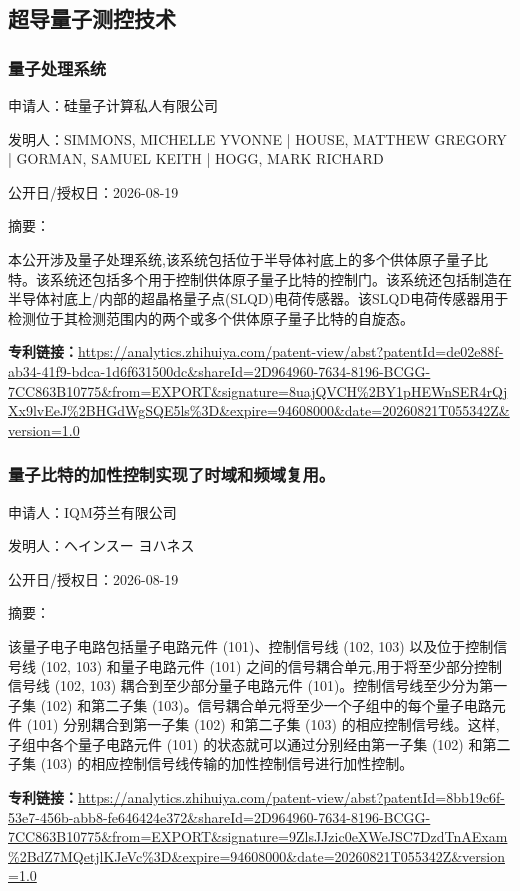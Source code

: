 \documentclass[12pt,a4paper]{ctexart}
\begin{document}
\subsection{ 超导量子测控技术 }

\subsubsection{ 量子处理系统 }

申请人：硅量子计算私人有限公司

发明人：SIMMONS, MICHELLE YVONNE | HOUSE, MATTHEW GREGORY | GORMAN, SAMUEL KEITH | HOGG, MARK RICHARD

公开日/授权日：2026-08-19

摘要：

本公开涉及量子处理系统,该系统包括位于半导体衬底上的多个供体原子量子比特。该系统还包括多个用于控制供体原子量子比特的控制门。该系统还包括制造在半导体衬底上/内部的超晶格量子点(SLQD)电荷传感器。该SLQD电荷传感器用于检测位于其检测范围内的两个或多个供体原子量子比特的自旋态。

\noindent\textbf{专利链接：}\url{https://analytics.zhihuiya.com/patent-view/abst?patentId=de02e88f-ab34-41f9-bdca-1d6f631500dc&shareId=2D964960-7634-8196-BCGG-7CC863B10775&from=EXPORT&signature=8uajQVCH%2BY1pHEWnSER4rQjXx9lvEeJ%2BHGdWgSQE5ls%3D&expire=94608000&date=20260821T055342Z&version=1.0}

\subsubsection{ 量子比特的加性控制实现了时域和频域复用。 }

申请人：IQM芬兰有限公司

发明人：ヘインスー ヨハネス

公开日/授权日：2026-08-19

摘要：

该量子电子电路包括量子电路元件 (101)、控制信号线 (102, 103) 以及位于控制信号线 (102, 103) 和量子电路元件 (101) 之间的信号耦合单元,用于将至少部分控制信号线 (102, 103) 耦合到至少部分量子电路元件 (101)。控制信号线至少分为第一子集 (102) 和第二子集 (103)。信号耦合单元将至少一个子组中的每个量子电路元件 (101) 分别耦合到第一子集 (102) 和第二子集 (103) 的相应控制信号线。这样,子组中各个量子电路元件 (101) 的状态就可以通过分别经由第一子集 (102) 和第二子集 (103) 的相应控制信号线传输的加性控制信号进行加性控制。

\noindent\textbf{专利链接：}\url{https://analytics.zhihuiya.com/patent-view/abst?patentId=8bb19c6f-53e7-456b-abb8-fe646424e372&shareId=2D964960-7634-8196-BCGG-7CC863B10775&from=EXPORT&signature=9ZlsJJzic0eXWeJSC7DzdTnAExam%2BdZ7MQetjlKJeVc%3D&expire=94608000&date=20260821T055342Z&version=1.0}
\end{document}
